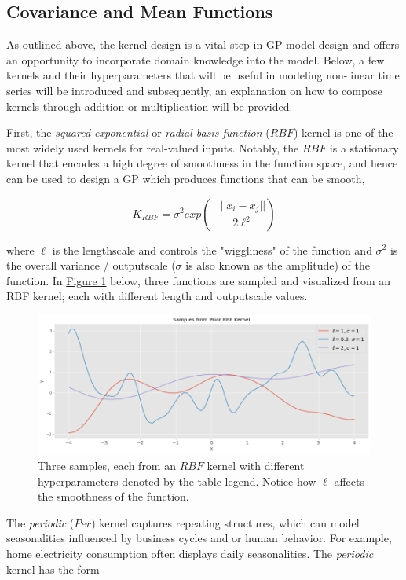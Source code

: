\subsection{Covariance and Mean Functions}

As outlined above, the kernel design is a vital step in GP model design and offers an opportunity to incorporate domain knowledge into the model. Below, a few kernels and their hyperparameters that will be useful in modeling non-linear time series will be introduced and subsequently, an explanation on how to compose kernels through addition or multiplication will be provided.

First, the \textit{squared exponential} or \textit{radial basis function} ($RBF$) kernel is one of the most widely used kernels for real-valued inputs. Notably, the $RBF$ is a stationary kernel that encodes a high degree of smoothness in the function space, and hence can be used to design a GP which produces functions that can be smooth,

$$K_{RBF} = \sigma^2 exp(-\frac{||x_i - x_j||}{2 \ell^2})$$

where $\ell$ is the lengthscale and controls the "wiggliness" of the function and $\sigma^2$ is the overall variance / outputscale  ($\sigma$ is also known as the amplitude) of the function. In \hyperlink{figure.1}{Figure 1} below, three functions are sampled and visualized from an RBF kernel; each with different length and outputscale values.

\begin{figure}[htp]
\centering
\graphicspath{ {./images/} }
\includegraphics[scale=0.49]{images/samples_rbf_prior.png}
\caption{Three samples, each from an $RBF$ kernel with different hyperparameters denoted by the table legend. Notice how $\ell$ affects the smoothness of the function.}
\end{figure}

The \textit{periodic} ($Per$) kernel captures repeating structures, which can model seasonalities influenced by business cycles and or human behavior. For example, home electricity consumption often displays daily seasonalities. The \textit{periodic} kernel has the form

